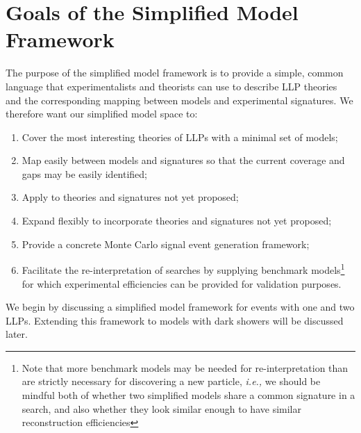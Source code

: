 \section{Goals of the Simplified Model Framework}
The purpose of the simplified model framework is to provide a simple, common language that experimentalists and theorists can use to describe LLP theories and the corresponding mapping between models and experimental signatures. We therefore want our simplified model space to:
%
\begin{enumerate}
\item Cover the most interesting theories of LLPs with a minimal set of models;
\item Map easily between models and signatures so that the current coverage and gaps may be easily identified;
\item Apply to theories and signatures not yet proposed;
\item Expand flexibly to incorporate theories and signatures not yet proposed;
\item Provide a concrete Monte Carlo signal event generation framework;
\item Facilitate the re-interpretation of searches by supplying benchmark models\footnote{Note that more benchmark models may be needed for re-interpretation than are strictly necessary for discovering a new particle, \emph{i.e.,} we should be mindful both of whether two simplified models share a common signature in a search, and also whether they look similar enough to have similar reconstruction efficiencies} for which experimental efficiencies can be provided for validation purposes.
\end{enumerate}
%
We begin by discussing a simplified model framework for events with one and two LLPs.  Extending this  framework to models with dark showers will be discussed later.


